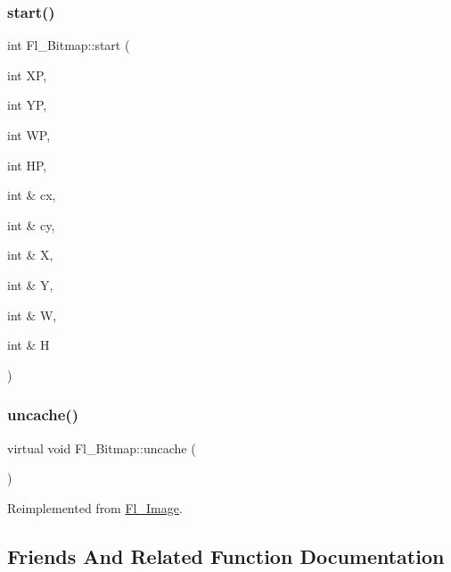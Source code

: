 \subsubsection{\texorpdfstring{start()}{start()}}
{\footnotesize\ttfamily int Fl\+\_\+\+Bitmap\+::start (\begin{DoxyParamCaption}\item[{int}]{XP,  }\item[{int}]{YP,  }\item[{int}]{WP,  }\item[{int}]{HP,  }\item[{int \&}]{cx,  }\item[{int \&}]{cy,  }\item[{int \&}]{X,  }\item[{int \&}]{Y,  }\item[{int \&}]{W,  }\item[{int \&}]{H }\end{DoxyParamCaption})\hspace{0.3cm}{\ttfamily [private]}}

\mbox{\label{class_fl___bitmap_afd50086093bdbf6c0de1c20ec1ecd4b5}} 
\subsubsection{\texorpdfstring{uncache()}{uncache()}}
{\footnotesize\ttfamily virtual void Fl\+\_\+\+Bitmap\+::uncache (\begin{DoxyParamCaption}{ }\end{DoxyParamCaption})\hspace{0.3cm}{\ttfamily [virtual]}}



Reimplemented from \hyperlink{class_fl___image_ab439ce86ab05a416defe4e31d4ea79c9}{Fl\+\_\+\+Image}.



\subsection{Friends And Related Function Documentation}
\mbox{\label{class_fl___bitmap_afdd004b46bf519fc92d7de53fa9e8f33}} 
